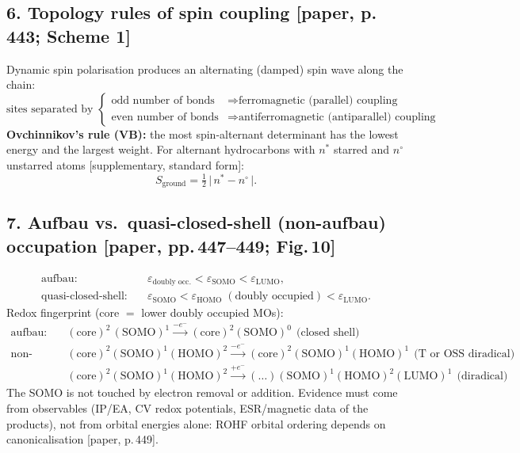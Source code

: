 \subsection*{6. Topology rules of spin coupling [paper, p.\,443; Scheme 1]}
Dynamic spin polarisation produces an alternating (damped) spin wave along the chain:
\begin{equation}
  \text{sites separated by }\begin{cases}
     \text{odd number of bonds} & \Rightarrow \text{ferromagnetic (parallel) coupling}\\
     \text{even number of bonds} & \Rightarrow \text{antiferromagnetic (antiparallel) coupling}
  \end{cases}
\end{equation}
\textbf{Ovchinnikov's rule (VB):} the most spin-alternant determinant has the lowest energy and
the largest weight. For alternant hydrocarbons with $n^*$ starred and $n^\circ$ unstarred atoms
[supplementary, standard form]:
\begin{equation}
  S_{\text{ground}} = \tfrac12\,\bigl|\,n^* - n^\circ\,\bigr|.
\end{equation}

\subsection*{7. Aufbau vs.\ quasi-closed-shell (non-aufbau) occupation [paper, pp.\,447--449; Fig.\,10]}
\begin{align}
  \text{aufbau:}&\quad \varepsilon_{\text{doubly occ.}} < \varepsilon_{\text{SOMO}} < \varepsilon_{\text{LUMO}},\\
  \text{quasi-closed-shell:}&\quad \varepsilon_{\text{SOMO}} < \varepsilon_{\text{HOMO}}\;(\text{doubly occupied}) < \varepsilon_{\text{LUMO}}.
\end{align}
Redox fingerprint (core $=$ lower doubly occupied MOs):
\begin{align}
  \text{aufbau:}\quad & (\text{core})^{2}\,(\text{SOMO})^{1}
     \xrightarrow{-e^-} (\text{core})^{2}(\text{SOMO})^{0}\ \ \text{(closed shell)}\\
  \text{non-aufbau:}\quad & (\text{core})^{2}(\text{SOMO})^{1}(\text{HOMO})^{2}
     \xrightarrow{-e^-} (\text{core})^{2}(\text{SOMO})^{1}(\text{HOMO})^{1}\ \ \text{(T or OSS diradical)}\\
  & (\text{core})^{2}(\text{SOMO})^{1}(\text{HOMO})^{2}
     \xrightarrow{+e^-} (\ldots)(\text{SOMO})^{1}(\text{HOMO})^{2}(\text{LUMO})^{1}\ \ \text{(diradical)}
\end{align}
The SOMO is not touched by electron removal or addition. Evidence must come from observables
(IP/EA, CV redox potentials, ESR/magnetic data of the products), not from orbital energies alone:
ROHF orbital ordering depends on canonicalisation [paper, p.\,449].


